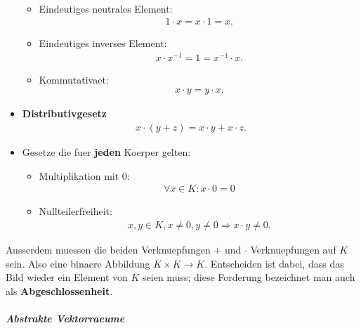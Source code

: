 \documentclass[12pt]{article}
\begin{document}
\begin{flushleft}
\begin{itemize}
\begin{itemize}
\begin{align*}
            \end{align*}
            \item Eindeutiges neutrales Element: \begin{align*}
                1 \cdot x = x \cdot 1 = x.
            \end{align*}
            \item Eindeutiges inverses Element: \begin{align*}
                x \cdot x^{-1} = 1 = x^{-1} \cdot x.
            \end{align*}
            \item Kommutativaet: \begin{align*}
                x \cdot y = y \cdot x.
            \end{align*}
        \end{itemize}
        \item \textbf{Distributivgesetz}
        \begin{align*}
            x \cdot (y + z) = x \cdot y + x \cdot z.
        \end{align*}
        \item Gesetze die fuer \textbf{jeden} Koerper gelten:
        \begin{itemize}
            \item Multiplikation mit 0: \begin{align*}
                \forall x \in K: x \cdot 0 = 0
            \end{align*}
            \item Nullteilerfreiheit: \begin{align*}
                x,y \in K, x \not = 0, y \not = 0 \Rightarrow x \cdot y \not = 0.
            \end{align*}
        \end{itemize}
    \end{itemize}
    Ausserdem muessen die beiden Verknuepfungen $+$ und $\cdot$ Verknuepfungen auf $K$ sein. Also eine binaere Abbildung $K \times K \rightarrow K$.
    Entscheiden ist dabei, dass das Bild wieder ein Element von $K$ seien muss; diese Forderung bezeichnet man auch als \textbf{Abgeschlossenheit}.
\end{flushleft}
\vspace{1cm}
\subparagraph{\large Abstrakte Vektorraeume}
\normalsize
\end{document}
